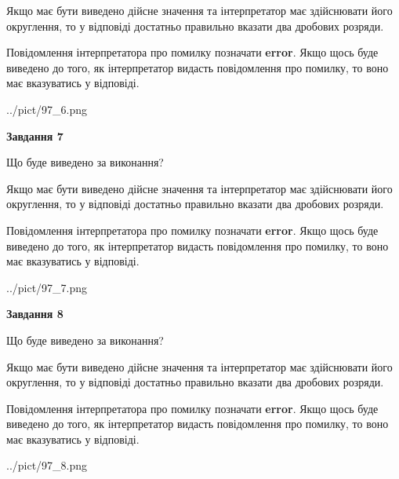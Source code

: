 \documentclass[12pt, ukrainian]{article}
\begin{document}
{\begin {Large}
Якщо має бути виведено дійсне значення та інтерпретатор має здійснювати його округлення, 
то у відповіді достатньо правильно вказати два дробових розряди.

Повідомлення інтерпретатора про помилку позначати \textbf{error}.
Якщо щось буде виведено до того, як інтерпретатор видасть повідомлення про помилку, 
то воно має вказуватись у відповіді. \par

\begin{center}
	{../pict/97_6.png}
\end{center}
\newpage

{\begin {center}\textbf{Завдання 7}\end {center}}\par
Що буде виведено за виконання? \par

Якщо має бути виведено дійсне значення та інтерпретатор має здійснювати його округлення, 
то у відповіді достатньо правильно вказати два дробових розряди.

Повідомлення інтерпретатора про помилку позначати \textbf{error}.
Якщо щось буде виведено до того, як інтерпретатор видасть повідомлення про помилку, 
то воно має вказуватись у відповіді. \par

\begin{center}
	{../pict/97_7.png}
\end{center}
\newpage

{\begin {center}\textbf{Завдання 8}\end {center}}\par
Що буде виведено за виконання? \par

Якщо має бути виведено дійсне значення та інтерпретатор має здійснювати його округлення, 
то у відповіді достатньо правильно вказати два дробових розряди.

Повідомлення інтерпретатора про помилку позначати \textbf{error}.
Якщо щось буде виведено до того, як інтерпретатор видасть повідомлення про помилку, 
то воно має вказуватись у відповіді. \par

\begin{center}
	{../pict/97_8.png}
\end{center}
\newpage


\end{Large}}
\end{document}
